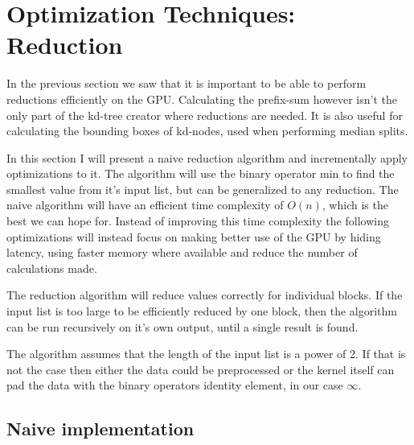 



\section{Optimization Techniques: Reduction}


In the previous section we saw that it is important to be able to
perform reductions efficiently on the GPU. Calculating the prefix-sum
however isn't the only part of the kd-tree creator where reductions
are needed. It is also useful for calculating the bounding boxes of
kd-nodes, used when performing median splits.

In this section I will present a naive reduction algorithm and
incrementally apply optimizations to it. The algorithm will use the
binary operator min to find the smallest value from it's input list,
but can be generalized to any reduction. The naive algorithm will have
an efficient time complexity of $O(n)$, which is the best we can hope
for. Instead of improving this time complexity the following
optimizations will instead focus on making better use of the GPU by
hiding latency, using faster memory where available and reduce the
number of calculations made.


The reduction algorithm will reduce values correctly for individual
blocks. If the input list is too large to be efficiently reduced by
one block, then the algorithm can be run recursively on it's own
output, until a single result is found.

The algorithm assumes that the length of the input list is a power of
2. If that is not the case then either the data could be preprocessed
or the kernel itself can pad the data with the binary operators
identity element, in our case $\infty$.

\subsection{Naive implementation}

